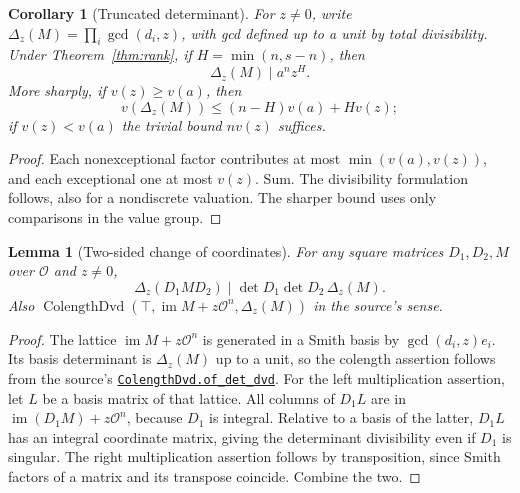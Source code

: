 \documentclass[11pt]{article}
\newtheorem{lemma}[theorem]{Lemma}
\newtheorem{corollary}[theorem]{Corollary}
\newcommand{\OO}{\mathcal O}
\newcommand{\im}{\operatorname{im}}
\newcommand{\anchor}[3]{\href{https://github.com/VladimirReshetnikov/ProveIt/blob/17bf37ab3b6740d5d7430065d2f2a1a2a03e8a0e/Analysis/GeneralizedRiemannHypothesis/Lean/grh/src/#1.lean\#L#2}{\texttt{#3}}}
\begin{document}
\begin{corollary}[Truncated determinant]\label{cor:trunc}
For $z\ne0$, write $\Delta_z(M)=\prod_i\gcd(d_i,z)$, with gcd defined up to a unit by total divisibility. Under Theorem~\ref{thm:rank}, if $H=\min(n,s-n)$, then
\[
 \Delta_z(M)\mid a^n z^H.
\]
More sharply, if $v(z)\ge v(a)$, then
\[
 v(\Delta_z(M))\le (n-H)v(a)+H v(z);
\]
if $v(z)<v(a)$ the trivial bound $n v(z)$ suffices.
\end{corollary}
\begin{proof}
Each nonexceptional factor contributes at most $\min(v(a),v(z))$, and each exceptional one at most $v(z)$. Sum. The divisibility formulation follows, also for a nondiscrete valuation. The sharper bound uses only comparisons in the value group.
\end{proof}

\begin{lemma}[Two-sided change of coordinates]\label{lem:ends}
For any square matrices $D_1,D_2,M$ over $\OO$ and $z\ne0$,
\[
 \Delta_z(D_1 M D_2)\mid \det D_1\det D_2\,\Delta_z(M).
\]
Also $\operatorname{ColengthDvd}(\top,\im M+z\OO^n,\Delta_z(M))$ in the source's sense.
\end{lemma}
\begin{proof}
The lattice $\im M+z\OO^n$ is generated in a Smith basis by $\gcd(d_i,z)e_i$. Its basis determinant is $\Delta_z(M)$ up to a unit, so the colength assertion follows from the source's \anchor{New/Reduction/Lattices/Colength}{160}{ColengthDvd.of\_det\_dvd}.
For the left multiplication assertion, let $L$ be a basis matrix of that lattice. All columns of $D_1 L$ are in $\im(D_1M)+z\OO^n$, because $D_1$ is integral. Relative to a basis of the latter, $D_1 L$ has an integral coordinate matrix, giving the determinant divisibility even if $D_1$ is singular. The right multiplication assertion follows by transposition, since Smith factors of a matrix and its transpose coincide. Combine the two.
\end{proof}
\end{document}
